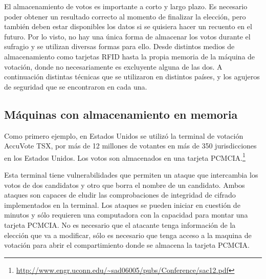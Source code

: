El almacenamiento de votos es importante a corto y largo plazo. Es necesario poder obtener un resultado correcto al momento de finalizar la elección, pero también deben estar disponibles los datos si se quisiera hacer un recuento en el futuro.
Por lo visto, no hay una única forma de almacenar los votos durante el sufragio y se utilizan diversas formas para ello. Desde distintos medios de almacenamiento como tarjetas RFID hasta la propia memoria de la máquina de votación, donde no necesariamente es excluyente alguna de las dos.
A continuación distintas técnicas que se utilizaron en distintos países, y los agujeros de seguridad que se encontraron en cada una.

\subsection{Máquinas con almacenamiento en memoria}

Como primero ejemplo, en Estados Unidos se utilizó la terminal de votación AccuVote TSX, por más de 12 millones de votantes en más de 350 jurisdicciones en los Estados Unidos. Los votos son almacenados en una tarjeta PCMCIA.\footnote{\url{http://www.engr.uconn.edu/~sad06005/pubs/Conference/sac12.pdf}}

Esta terminal tiene vulnerabilidades que permiten un ataque que intercambia los votos de dos candidatos y otro que borra el nombre de un candidato. Ambos ataques son capaces de eludir las comprobaciones de integridad de cifrado implementados en la terminal. Los ataques se pueden iniciar en cuestión de minutos y sólo requieren una computadora con la capacidad para montar una tarjeta PCMCIA. No es necesario que el atacante tenga información de la elección que va a modificar, sólo es necesario que tenga acceso a la maquina de votación para abrir el compartimiento donde se almacena la tarjeta PCMCIA.

